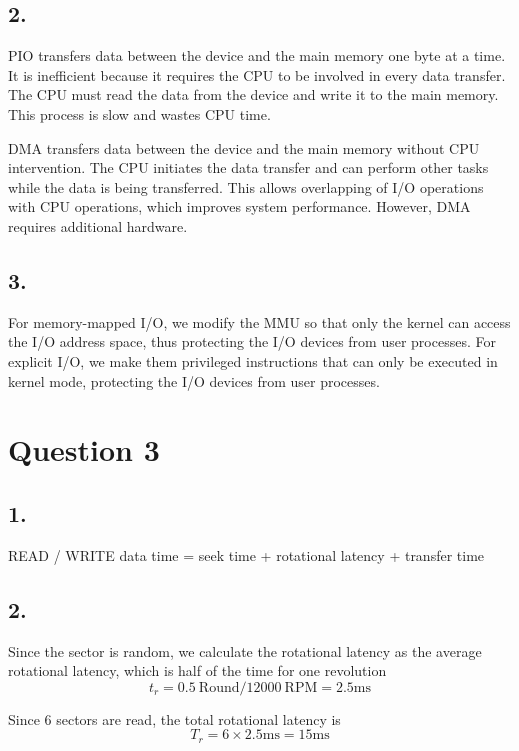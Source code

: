 \documentclass[a4paper,12pt]{article}
\begin{document}
\subsection*{2.}

PIO transfers data between the device and the main memory one byte at a time. It is inefficient because it requires the CPU to be involved in every data transfer. The CPU must read the data from the device and write it to the main memory. This process is slow and wastes CPU time.

DMA transfers data between the device and the main memory without CPU intervention. The CPU initiates the data transfer and can perform other tasks while the data is being transferred. This allows overlapping of I/O operations with CPU operations, which improves system performance. However, DMA requires additional hardware.

\subsection*{3.}

For memory-mapped I/O, we modify the MMU so that only the kernel can access the I/O address space, thus protecting the I/O devices from user processes. For explicit I/O, we make them privileged instructions that can only be executed in kernel mode, protecting the I/O devices from user processes.

\section*{Question 3}

\subsection*{1.}

READ / WRITE data time = seek time + rotational latency + transfer time

\subsection*{2.}

Since the sector is random, we calculate the rotational latency as the average rotational latency, which is half of the time for one revolution
\begin{equation*}
	t_r = 0.5 \ \text{Round} / 12000 \ \text{RPM} = 2.5 \text{ms}
\end{equation*}

Since 6 sectors are read, the total rotational latency is
\begin{equation*}
	T_r = 6 \times 2.5 \text{ms} = 15 \text{ms}
\end{equation*}
\end{document}
